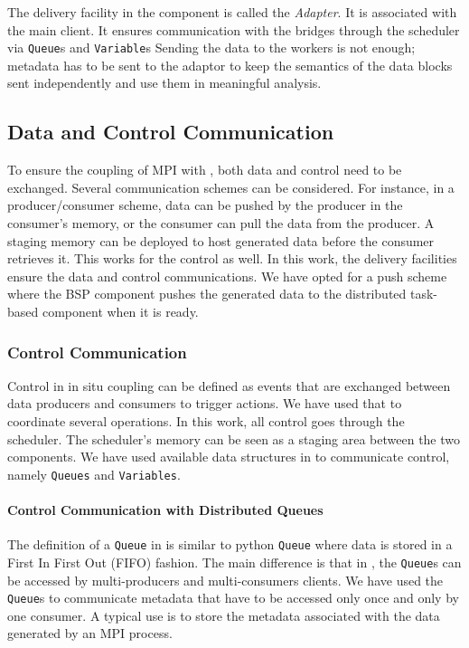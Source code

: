 The delivery facility in the \dask component is called the \textit{Adapter}. It is associated with the main \dask client. It ensures communication with the \deisa bridges through the scheduler via \texttt{Queue}s and \texttt{Variable}s
Sending the data to the workers is not enough; metadata has to be sent to the adaptor to keep the semantics of the data blocks sent independently and use them in meaningful analysis. 


\subsection{Data and Control Communication}\label{sec:DandCcomm}

To ensure the coupling of MPI with \dask, both data and control need to be exchanged. Several communication schemes can be considered. For instance, in a producer/consumer scheme, data can be pushed by the producer in the consumer's memory, or the consumer can pull the data from the producer. A staging memory can be deployed to host generated data before the consumer retrieves it. This works for the control as well.      
In this work, the delivery facilities ensure the data and control communications. We have opted for a push scheme where the BSP component pushes the generated data to the distributed task-based component when it is ready. 

\subsubsection{Control Communication}\label{sec:DandCcomm:control}
Control in in situ coupling can be defined as events that are exchanged between data producers and consumers to trigger actions. We have used that to coordinate several operations. In this work, all control goes through the \dask scheduler. The scheduler's memory can be seen as a staging area between the two components. We have used available data structures in \dask to communicate control, namely \texttt{Queues} and \texttt{Variables}. 

\paragraph{Control Communication with \dask Distributed Queues} 
The definition of a \texttt{Queue} in \dask is similar to python \texttt{Queue} where data is stored in a First In First Out (FIFO) fashion. The main difference is that in \dask, the \texttt{Queue}s can be accessed by multi-producers and multi-consumers \dask clients. 
We have used the \texttt{Queue}s to communicate metadata that have to be accessed only once and only by one consumer. A typical use is to store the metadata associated with the data generated by an MPI process.  

